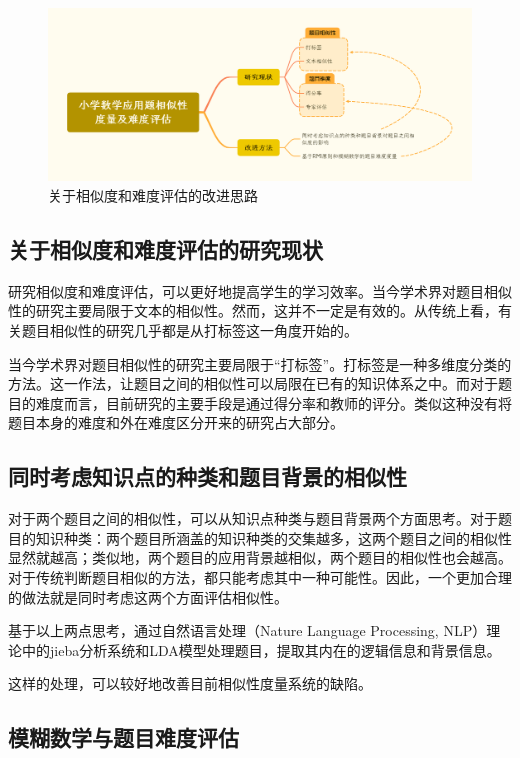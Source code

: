 \begin{figure}[h]
    \centering
    \includegraphics[scale=0.22]{res/figure042227.png}
    \caption{关于相似度和难度评估的改进思路}
\end{figure}
 
\subsection{关于相似度和难度评估的研究现状}

研究相似度和难度评估，可以更好地提高学生的学习效率。当今学术界对题目相似性的研究主要局限于文本的相似性。然而，这并不一定是有效的。从传统上看，有关题目相似性的研究几乎都是从打标签这一角度开始的\cite{xuTimunandupinggufangfayanjiuzongshu2022}。

当今学术界对题目相似性的研究主要局限于“打标签”。打标签是一种多维度分类的方法。这一作法，让题目之间的相似性可以局限在已有的知识体系之中。而对于题目的难度而言，目前研究的主要手段是通过得分率和教师的评分。类似这种没有将题目本身的难度和外在难度区分开来的研究占大部分。

\subsection{同时考虑知识点的种类和题目背景的相似性}

对于两个题目之间的相似性，可以从知识点种类与题目背景两个方面思考。对于题目的知识种类：两个题目所涵盖的知识种类的交集越多，这两个题目之间的相似性显然就越高；类似地，两个题目的应用背景越相似，两个题目的相似性也会越高。对于传统判断题目相似的方法，都只能考虑其中一种可能性。因此，一个更加合理的做法就是同时考虑这两个方面评估相似性。

基于以上两点思考，通过自然语言处理（Nature Language Processing, NLP）理论中的jieba分析系统和LDA模型处理题目，提取其内在的逻辑信息和背景信息。

这样的处理，可以较好地改善目前相似性度量系统的缺陷。

\subsection{模糊数学与题目难度评估}

